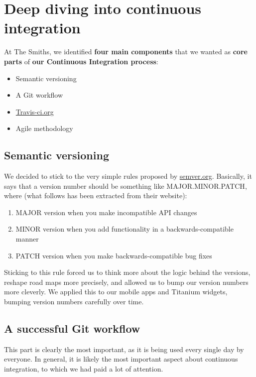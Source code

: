 \section{Deep diving into continuous integration}

At The Smiths, we identified \textbf{four main components} that we wanted as \textbf{core parts} of \textbf{our Continuous Integration process}:
\begin{itemize}
  \item Semantic versioning
  \item A Git workflow
  \item \href{https://travis-ci.com/}{Travis-ci.org}
  \item Agile methodology
\end{itemize}

\subsection{Semantic versioning}\label{semantic-versioning}

We decided to stick to the very simple rules proposed by \href{http://semver.org/}{semver.org}. Basically, it says that a version number should be something like \textsc{MAJOR.MINOR.PATCH}, where (what follows has been extracted from their website):
\begin{enumerate}
  \item \textsc{MAJOR} version when you make incompatible API changes
  \item \textsc{MINOR} version when you add functionality in a backwards-compatible manner
  \item \textsc{PATCH} version when you make backwards-compatible bug fixes
\end{enumerate}

Sticking to this rule forced us to think more about the logic behind the versions, reshape road maps more precisely, and allowed us to bump our version numbers more cleverly. We applied this to our mobile apps and Titanium widgets, bumping version numbers carefully over time.

\subsection{A successful Git workflow}

This part is clearly the most important, as it is being used every single day by everyone. In general, it is likely the most important aspect about continuous integration, to which we had paid a lot of attention.

